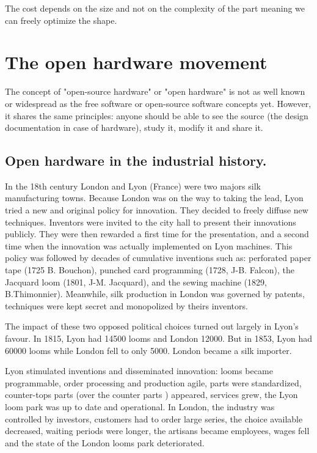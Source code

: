 The cost depends on the size and not on the complexity of the part meaning we can freely optimize the shape.


\section{The open hardware movement} %

The concept of "open-source hardware" or "open hardware" is not as well known or widespread as the free software or open-source software concepts yet. However, it shares the same principles: anyone should be able to see the source (the design documentation in case of hardware), study it, modify it and share it.


\subsection{Open hardware in the industrial history.} %

In the 18th century London and Lyon (France) were two majors silk manufacturing towns. Because London was on the way to taking the lead, Lyon tried a new and original policy for innovation. They decided to freely diffuse new techniques. Inventors were invited to the city hall to present their innovations publicly. They were then rewarded a first time for the presentation, and a second time when the innovation was actually implemented on Lyon machines. This policy was followed by decades of cumulative inventions such as: perforated paper tape (1725 B. Bouchon), punched card programming (1728, J-B. Falcon), the Jacquard loom (1801, J-M. Jacquard), and the sewing machine (1829, B.Thimonnier). Meanwhile, silk production in London was governed by patents, techniques were kept secret and monopolized by theirs inventors. \parencite{alain1997fate}

The impact of these two opposed political choices turned out largely in Lyon’s favour. In 1815, Lyon had 14500 looms and London 12000. But in 1853, Lyon had 60000 looms while London fell to only 5000. London became a silk importer.

Lyon stimulated inventions and disseminated innovation: looms became programmable, order processing and production agile, parts were standardized, counter-tops parts (over the counter parts ) appeared, services grew, the Lyon loom park was up to date and operational.
In London, the industry was controlled by investors, customers had to order large series, the choice available decreased, waiting periods were longer, the artisans became employees, wages fell and the state of the London looms park deteriorated.

